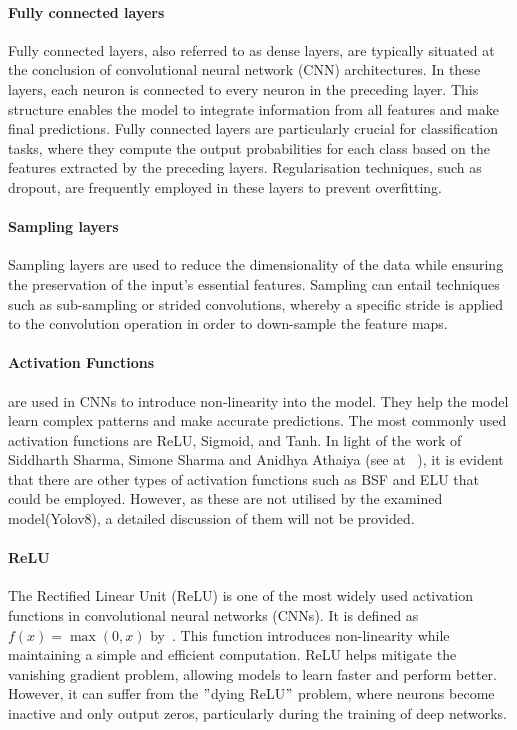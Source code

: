 \paragraph{Fully connected layers}\label{par:fully-connected-layers}

Fully connected layers, also referred to as dense layers, are typically situated at
the conclusion of convolutional neural network (CNN) architectures.
In these layers, each neuron is connected to every neuron in the preceding layer.
This structure enables the model to integrate information from all features and make final predictions.
Fully connected layers are particularly crucial for classification tasks,
where they compute the output probabilities for each class based on the features extracted by the preceding layers.
Regularisation techniques, such as dropout, are frequently employed in these layers to prevent overfitting.

\paragraph{Sampling layers}\label{par:sampling-layers}

Sampling layers are used to reduce the dimensionality of the data while ensuring the preservation of the input's essential features.
Sampling can entail techniques such as sub-sampling or strided convolutions,
whereby a specific stride is applied to the convolution operation in order to down-sample the feature maps.


\paragraph{Activation Functions}\label{par:activation-functions}
 are used in CNNs to introduce non-linearity into the model.
They help the model learn complex patterns and make accurate predictions.
The most commonly used activation functions are ReLU, Sigmoid, and Tanh.
In light of the work of Siddharth Sharma, Simone Sharma and Anidhya Athaiya (see at ~\cite{sharma2017activation}), it is evident that there are
other types of activation functions such as BSF and ELU that could be employed.
However, as these are not utilised by the examined model(Yolov8), a detailed discussion of them will not be provided.

\paragraph{ReLU}\label{par:relu}
The Rectified Linear Unit (ReLU) is one of the most widely used activation functions in convolutional neural networks (CNNs).
It is defined as \( f(x) = \max(0, x) \) by~\cite{sharma2017activation}.
This function introduces non-linearity while maintaining a simple and efficient computation.
ReLU helps mitigate the vanishing gradient problem, allowing models to learn faster and perform better.
However, it can suffer from the \("\)dying ReLU\("\) problem, where neurons become inactive and only output zeros,
particularly during the training of deep networks.

